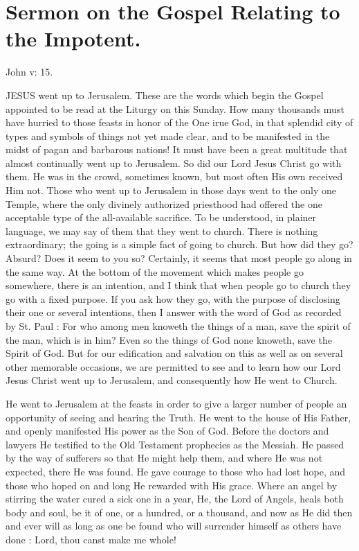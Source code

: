 \chapter{Sermon on the Gospel Relating to the Impotent.}

John v: 15.

JESUS went up to Jerusalem. These are the 
words which begin the Gospel appointed to 
be read at the Liturgy on this Sunday. How 
many thousands must have hurried to those 
feasts in honor of the One irue God, in that 
splendid city of types and symbols of things 
not yet made clear, and to be manifested in the 
midst of pagan and barbarous nations! It must 
have been a great multitude that almost continually
went up to Jerusalem. So did our Lord 
Jesus Christ go with them. He was in the crowd, 
sometimes known, but most often His own received
Him not. Those who went up to Jerusalem
in those days went to the only one Temple, 
where the only divinely authorized priesthood had 
offered the one acceptable type of the all-available
sacrifice. To be understood, in plainer language,
we may say of them that they went to 
church. There is nothing extraordinary; the 
going is a simple fact of going to church. But
how did they go? Absurd? Does it seem to 
you so? Certainly, it seems that most people go 
along in the same way. At the bottom of the 
movement which makes people go somewhere, 
there is an intention, and I think that when people
go to church they go with a fixed purpose. 
If you ask how they go, with the purpose of 
disclosing their one or several intentions, then I 
answer with the word of God as recorded by 
St. Paul : For who among men knoweth the 
things of a man, save the spirit of the man, 
which is in him? Even so the things of God 
none knoweth, save the Spirit of God. But for 
our edification and salvation on this as well as 
on several other memorable occasions, we are permitted
to see and to learn how our Lord Jesus 
Christ went up to Jerusalem, and consequently 
how He went to Church. 

He went to Jerusalem at the feasts in order to 
give a larger number of people an opportunity 
of seeing and hearing the Truth. He went to 
the house of His Father, and openly manifested 
His power as the Son of God. Before the doctors
and lawyers He testified to the Old Testament
prophecies as the Messiah. He passed by the 
way of sufferers so that He might help them, and 
where He was not expected, there He was found.
He gave courage to those who had lost hope, and 
those who hoped on and long He rewarded with 
His grace. Where an angel by stirring the 
water cured a sick one in a year, He, the Lord 
of Angels, heals both body and soul, be it of 
one, or a hundred, or a thousand, and now as 
He did then and ever will as long as one be 
found who will surrender himself as others have 
done : Lord, thou canst make me whole! 

